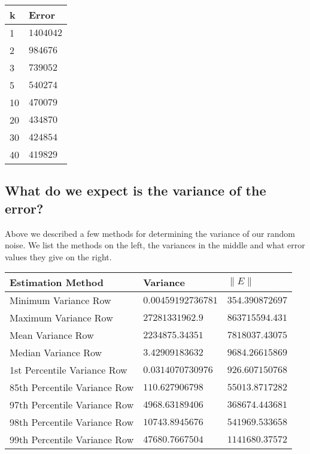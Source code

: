 \documentclass[10pt]{article}
\begin{document}
\begin{center}
    \begin{tabular}{| l | l |}
    \hline
    k & Error\\ \hline
    1 & \(1404042\) \\ \hline
    2 & \(984676\) \\ \hline
    3 & \(739052\) \\ \hline
    5 & \(540274\) \\ \hline
    10 & \(470079\) \\ \hline
    20 & \(434870\) \\ \hline
    30 & \(424854\) \\ \hline
    40 & \(419829\) \\ \hline
    \end{tabular}
\end{center}

\subsection{What do we expect is the variance of the error?}

Above we described a few methods for determining the variance of our random noise.
We list the methods on the left, the variances in the middle and what error values they give on the right.

\begin{center}
    \begin{tabular}{| l | l | l |}
    \hline
    Estimation Method & Variance & \(\|E\|\)  \\ \hline
    Minimum Variance Row & \(0.00459192736781\) & \(354.390872697\) \\ \hline
    Maximum Variance Row & \(27281331962.9\) & \(863715594.431\) \\ \hline
    Mean Variance Row & \(2234875.34351\) & \(7818037.43075\) \\ \hline
    Median Variance Row & \(3.42909183632\) & \(9684.26615869\) \\ \hline
    1st Percentile Variance Row & \(0.0314070730976\) & \(926.607150768\) \\ \hline
    85th Percentile Variance Row & \(110.627906798\) & \(55013.8717282\) \\ \hline
    97th Percentile Variance Row & \(4968.63189406\) & \(368674.443681\) \\ \hline
    98th Percentile Variance Row & \(10743.8945676\) & \(541969.533658\) \\ \hline
    99th Percentile Variance Row & \(47680.7667504\) & \(1141680.37572\) \\ \hline
    \end{tabular}
\end{center}
\end{document}
